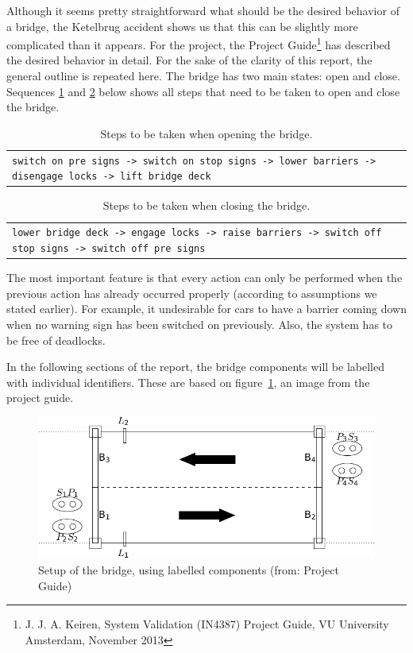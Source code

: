 Although it seems pretty straightforward what should be the desired behavior of a bridge, the Ketelbrug accident shows us that this can be slightly more complicated than it appears. For the project, the Project Guide\footnote{J. J. A. Keiren, System Validation (IN4387) Project Guide, VU University Amsterdam, November 2013} has described the desired behavior in detail. For the sake of the clarity of this report, the general outline is repeated here. The bridge has two main states: open and close. Sequences \ref{tab:open} and \ref{tab:close} below shows all steps that need to be taken to open and close the bridge.
%
\begin{table}[h]%
\begin{tabular}{l}
	\footnotesize
	\texttt{switch on pre signs -> switch on stop signs -> lower barriers -> disengage locks -> lift bridge deck}\\
\end{tabular}
\caption{Steps to be taken when opening the bridge.}
\label{tab:open}
\end{table}
%
\begin{table}[h]%
\begin{tabular}{l}
	\footnotesize
	\texttt{lower bridge deck -> engage locks -> raise barriers -> switch off stop signs -> switch off pre signs}\\
\end{tabular}
\caption{Steps to be taken when closing the bridge.}
\label{tab:close}
\end{table}
%
The most important feature is that every action can only be performed when the previous action has already occurred properly (according to assumptions we stated earlier). For example, it undesirable for cars to have a barrier coming down when no warning sign has been switched on previously. Also, the system has to be free of deadlocks.

In the following sections of the report, the bridge components will be labelled with individual identifiers. These are based on figure~\ref{fig:setup}, an image from the project guide.
%
\begin{figure}[htb]%
\includegraphics[width=\columnwidth]{Images/setup.pdf}%
\caption{Setup of the bridge, using labelled components (from: Project Guide)}%
\label{fig:setup}%
\end{figure}
%
